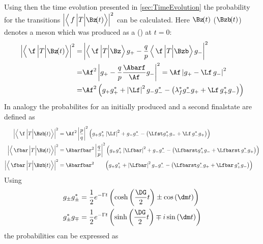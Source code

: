 Using then the time evolution presented in \cref{sec:TimeEvolution} the probability for the transitions $\left|\left<\,f\,\Big|T\Big|\Bz\!(t)\right>\right|^2$ can be calculated.
Here $\Bz\!(t)$ ($\Bzb\!(t)$) denotes a \B meson which was produced as a \Bz (\Bzb) at $t=0$:
\begin{align}
\left|\left<\,\f\,\Big|T\Big|\Bz\!(t)\right>\right|^2 =&
\left|\left<\,\f\,\Big|T\Big|\Bz\right>g_+-\frac{q}{p}\left<\,\f\,\Big|T\Big|\Bzb\right>g_-\right|^2\nonumber\\
=&\Af^2\left|g_+ - \frac{q}{p}\frac{\Abarf}{\Af} g_-\right|^2=\Af\left|g_+ -\Lf\,g_-\right|^2\nonumber\\
=&\Af^2\left(g_+g_+^*+\left|\Lf\right|^2g_-g_-^*-\left(\lambda_{f}^*g_-^*g_+ + \Lf\,g_+^* g_-\right)\right)
\end{align}
In analogy the probabilites for an initially produced \Bzb and a second finalstate \fbar are defined as
\begin{align}
\left|\left<\,\f\,\Big|T\Big|\Bzb\!(t)\right>\right|^2 &=
\Af^2\left|\frac{p}{q}\right|^2\left(g_+g_+^*\left|\Lf\right|^2+g_-g_-^*-\left(\Lfst g_+^*g_- + \Lf\,g_-^* g_+\right)\right)\\
\left|\left<\,\fbar\,\Big|T\Big|\Bz\!(t)\right>\right|^2 &=
\Abarfbar^2\left|\frac{q}{p}\right|^2\left(g_+g_+^*\left|\Lfbar\right|^2+g_-g_-^*-\left(\Lfbarst g_+^*g_- + \Lfbarst\,g_-^* g_+\right)\right)\\
\left|\left<\,\fbar\,\Big|T\Big|\Bzb\!(t)\right>\right|^2 &=
\Abarfbar^2\hphantom{\left|\frac{q}{p}\right|^2}\left(g_+g_+^*+\left|\Lfbar\right|^2g_-g_-^*-\left(\Lfbarst g_-^*g_+ + \Lfbar\,g_+^* g_-\right)\right)
\end{align}
Using
\begin{align}
g_{\pm}g_{\pm}^{*} &= \frac{1}{2}e^{-\Gamma t}\left(\cosh\left(\frac{\DG}{2}t\right)\pm\cos\left(\dm t\right)\right)\\
g_{\pm}^*g_{\mp} &=  \frac{1}{2}e^{-\Gamma t}\left(\sinh\left(\frac{\DG}{2}t\right)\mp i\sin\left(\dm t\right)\right)
\end{align}
the probabilities can be expressed as
